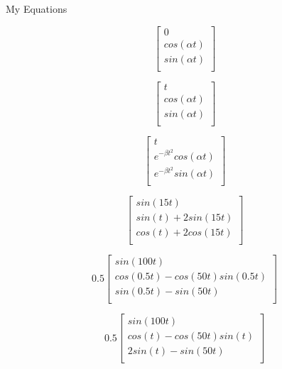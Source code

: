 \documentclass[preview]{standalone}
\begin{document}
My Equations


\[
\begin{bmatrix}
    0 \\
    cos(\alpha t) \\
    sin(\alpha t) \\
\end{bmatrix}
\]

\[
\begin{bmatrix}
    t \\
    cos(\alpha t) \\
    sin(\alpha t) \\
\end{bmatrix}
\]

\[
\begin{bmatrix}
    t \\
    e^{-\beta t^2}cos(\alpha t) \\
    e^{-\beta t^2}sin(\alpha t) \\
\end{bmatrix}
\]


\[
\begin{bmatrix}
    sin(15t) \\
    sin(t)+2sin(15t) \\
    cos(t)+2cos(15t) \\
\end{bmatrix}
\]


\[0.5
\begin{bmatrix}
    sin(100t) \\
    cos(0.5t)-cos(50t)sin(0.5t) \\
    sin(0.5t)-sin(50t) \\
\end{bmatrix}
\]


\[0.5
\begin{bmatrix}
    sin(100t) \\
    cos(t)-cos(50t)sin(t) \\
    2sin(t)-sin(50t) \\
\end{bmatrix}
\]
\end{document}
